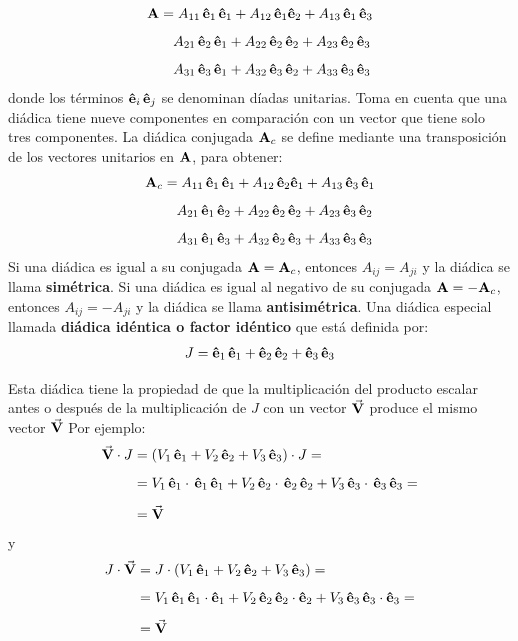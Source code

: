 \documentclass[hidelinks,12pt]{article}
\begin{document}
\begin{align*}
\vb{A} &= A_{11} \, \vu{e}_{1} \, \vu{e}_{1} + A_{12} \, \vu{e}_{1} \vu{e}_{2} + A_{13} \, \vu{e}_{1} \, \vu{e}_{3} \\[0.5em]  
&{\quad} A_{21} \, \vu{e}_{2} \, \vu{e}_{1} + A_{22} \, \vu{e}_{2} \, \vu{e}_{2} + A_{23} \, \vu{e}_{2} \, \vu{e}_{3} \\[0.5em]
&{\quad} A_{31} \, \vu{e}_{3} \, \vu{e}_{1} + A_{32} \, \vu{e}_{3} \, \vu{e}_{2} + A_{33} \, \vu{e}_{3} \, \vu{e}_{3}    
\end{align*}
donde los términos $\vu{e}_{i} \, \vu{e}_{j}$ se denominan díadas unitarias. Toma en cuenta que una diádica tiene nueve componentes en comparación con un vector que tiene solo tres componentes. La diádica conjugada $\vb{A}_{c}$ se define mediante una transposición de los vectores unitarios en $\vb{A}$, para obtener:
\begin{align*}
\vb{A}_{c} &= A_{11} \, \vu{e}_{1} \, \vu{e}_{1} + A_{12} \, \vu{e}_{2} \vu{e}_{1} + A_{13} \, \vu{e}_{3} \, \vu{e}_{1} \\[0.5em]  
&{\quad} A_{21} \, \vu{e}_{1} \, \vu{e}_{2} + A_{22} \, \vu{e}_{2} \, \vu{e}_{2} + A_{23} \, \vu{e}_{3} \, \vu{e}_{2} \\[0.5em]
&{\quad} A_{31} \, \vu{e}_{1} \, \vu{e}_{3} + A_{32} \, \vu{e}_{2} \, \vu{e}_{3} + A_{33} \, \vu{e}_{3} \, \vu{e}_{3}    
\end{align*}
Si una diádica es igual a su conjugada $\vb{A} = \vb{A}_{c}$, entonces $A_{ij} = A_{ji}$ y la diádica se llama \textbf{simétrica}. Si una diádica es igual al negativo de su conjugada $\vb{A} = - \vb{A}_{c}$, entonces $A_{ij} = - A_{ji}$ y la diádica se llama \textbf{antisimétrica}. Una diádica especial llamada \textbf{diádica idéntica o factor idéntico} que está definida por:
\begin{align*}
J = \vu{e}_{1} \, \vu{e}_{1} + \vu{e}_{2} \, \vu{e}_{2} + \vu{e}_{3} \, \vu{e}_{3}
\end{align*}

Esta diádica tiene la propiedad de que la multiplicación del producto escalar antes o después de la multiplicación de $J$ con un vector $\va{V}$ produce el mismo vector $\va{V}$ Por ejemplo:
\begin{align*}
\va{V} \cdot J &= ( V_{1} \, \vu{e}_{1} + V_{2} \, \vu{e}_{2} + V_{3}  \, \vu{e}_{3} ) \cdot J = \\[0.5em]
&= V_{1} \, \vu{e}_{1} \cdot \, \vu{e}_{1} \, \vu{e}_{1} + V_{2} \, \vu{e}_{2} \cdot \,\vu{e}_{2} \, \vu{e}_{2} + V_{3} \,\vu{e}_{3} \cdot \, \vu{e}_{3} \, \vu{e}_{3} = \\[0.5em]
&= \va{V}
\end{align*}
y
\begin{align*}
J \cdot \va{V} &= J \cdot (V_{1} \, \vu{e}_{1} + V_{2} \, \vu{e}_{2} + V_{3} \, \vu{e}_{3}) = \\[0.5em]
&= V_{1} \, \vu{e}_{1} \, \vu{e}_{1} \cdot \vu{e}_{1} + V_{2} \, \vu{e}_{2} \, \vu{e}_{2} \cdot \vu{e}_{2} + V_{3} \, \vu{e}_{3} \, \vu{e}_{3} \cdot \vu{e}_{3} = \\[0.5em]
&= \va{V}
\end{align*}
\end{document}
